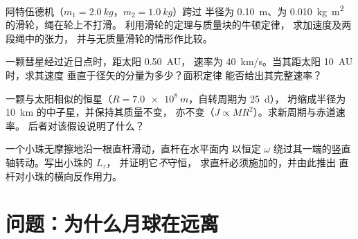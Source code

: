 \begin{exercise}[$\star\star$]\label{exo:b1:angular-momentum:9}
阿特伍德机（$m_1 = \qty{2.0}{kg}$，$m_2 = \qty{1.0}{kg}$）跨过
半径为 \qty{0.10}{m}、为 \qty{0.010}{kg.m^2} 的滑轮，绳在轮上不打滑。
利用滑轮的定理与质量块的牛顿定律，
求加速度及两段绳中的张力，
并与无质量滑轮的情形作比较。
\end{exercise}

\begin{exercise}[$\star\star\star$]\label{exo:b1:angular-momentum:10}
一颗彗星经过近日点时，距太阳 \qty{0.50}{AU}，
速率为 \qty{40}{km/s}。当其距太阳 \qty{10}{AU} 时，求其速度
垂直于径矢的分量为多少？面积定律
能否给出其完整速率？
\end{exercise}

\begin{exercise}[$\star\star\star$]\label{exo:b1:angular-momentum:11}
一颗与太阳相似的恒星（$R = \qty{7.0e8}{m}$，自转周期为 \qty{25}{d}），
坍缩成半径为 \qty{10}{km} 的中子星，并保持其质量不变，
亦不变（$J \propto MR^2$）。求新周期与赤道速率。
后者对该假设说明了什么？
\end{exercise}

\begin{exercise}[$\star\star\star$]\label{exo:b1:angular-momentum:12}
一个小珠无摩擦地沿一根直杆滑动，直杆在水平面内
以恒定 $\omega$ 绕过其一端的竖直轴转动。写出小珠的 $L_z$，
并证明它\emph{不}守恒，
求直杆必须施加的，并由此推出
直杆对小珠的横向反作用力。
\end{exercise}

\section{问题：为什么月球在远离}

